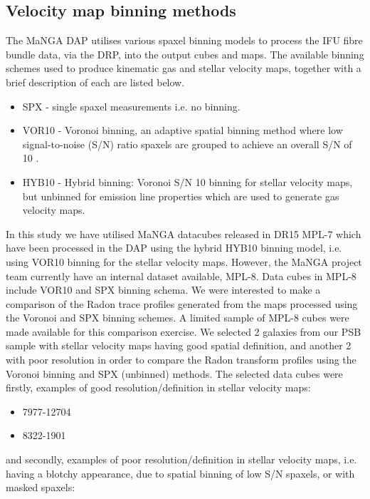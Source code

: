 \subsection{Velocity map binning methods}
\label{sec:binning-methods}
The MaNGA DAP utilises various spaxel binning models to process the IFU fibre bundle data, via the DRP, into the output cubes and maps. The available binning schemes used to produce kinematic gas and stellar velocity maps, together with a brief description of each are listed below.

\begin{itemize}
    \item SPX - single spaxel measurements i.e. no binning.
    \item VOR10 - Voronoi binning, an adaptive spatial binning method where low signal-to-noise (S/N) ratio spaxels are grouped to achieve an overall S/N of 10  \citep{2003MNRAS.342..345C, 2019arXiv190100856W}.
    \item HYB10 - Hybrid binning: Voronoi S/N 10 binning for stellar velocity maps, but unbinned for emission line properties which are used to generate gas velocity maps.
\end{itemize}  

In this study we have utilised MaNGA datacubes released in DR15 MPL-7 which have been processed in the DAP using the hybrid HYB10 binning model, i.e. using VOR10 binning for the stellar velocity maps. However, the MaNGA project team currently have an internal dataset available, MPL-8. Data cubes in MPL-8 include VOR10 and SPX binning schema. We were interested to make a comparison of the Radon trace profiles generated from the maps processed using the Voronoi and SPX binning schemes. A limited sample of MPL-8 cubes were made available for this comparison exercise. We selected 2 galaxies from our PSB sample with stellar velocity maps having good spatial definition, and another 2 with poor resolution in order to compare the Radon transform profiles using the Voronoi binning and SPX (unbinned) methods. The selected data cubes were firstly, examples of good resolution/definition in stellar velocity maps:

\begin{itemize}
    \item 7977-12704
    \item 8322-1901
\end{itemize}

and secondly, examples of poor resolution/definition in stellar velocity maps, i.e. having a blotchy appearance, due to spatial binning of low S/N spaxels, or with masked spaxels:

